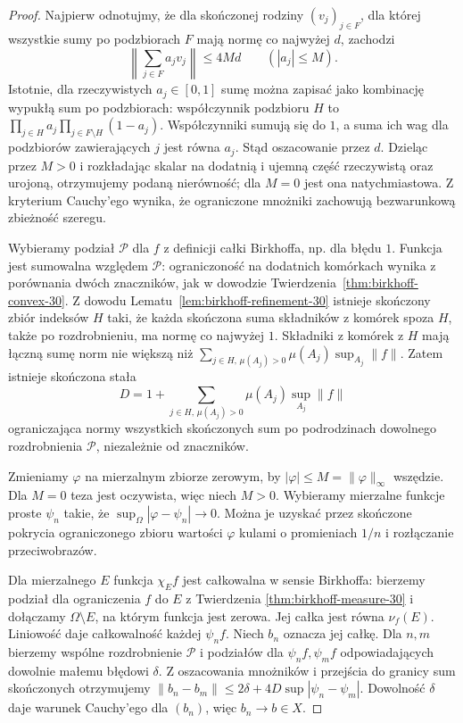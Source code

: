 \begin{proof}
Najpierw odnotujmy, że dla skończonej rodziny
$(v_j)_{j\in F}$, dla której wszystkie sumy po
podzbiorach $F$ mają normę co najwyżej $d$, zachodzi
\[
 \left\|\sum_{j\in F}a_jv_j\right\|\le4Md
 \qquad (|a_j|\le M).
\]
Istotnie, dla rzeczywistych $a_j\in[0,1]$ sumę
można zapisać jako kombinację wypukłą sum po
podzbiorach: współczynnik podzbioru $H$ to
$\prod_{j\in H}a_j\prod_{j\in F\setminus H}(1-a_j)$.
Współczynniki sumują się do $1$, a suma ich wag
dla podzbiorów zawierających $j$ jest równa $a_j$.
Stąd oszacowanie przez $d$. Dzieląc przez $M>0$
i rozkładając skalar na dodatnią i ujemną część
rzeczywistą oraz urojoną, otrzymujemy podaną
nierówność; dla $M=0$ jest ona natychmiastowa.
Z kryterium Cauchy'ego wynika, że ograniczone
mnożniki zachowują bezwarunkową zbieżność szeregu.

Wybieramy podział $\mathcal P$ dla $f$ z definicji
całki Birkhoffa, np. dla błędu $1$.
Funkcja jest sumowalna względem $\mathcal P$:
ograniczoność na dodatnich komórkach wynika
z porównania dwóch znaczników, jak w dowodzie
Twierdzenia~\ref{thm:birkhoff-convex-30}.
Z dowodu Lematu~\ref{lem:birkhoff-refinement-30}
istnieje skończony zbiór indeksów $H$ taki,
że każda skończona suma składników z komórek
spoza $H$, także po rozdrobnieniu, ma normę
co najwyżej $1$. Składniki z komórek z $H$
mają łączną sumę norm nie większą niż
$\sum_{j\in H,\,\mu(A_j)>0}\mu(A_j)\sup_{A_j}\|f\|$.
Zatem istnieje skończona stała
\[
 D=1+\sum_{j\in H,\,\mu(A_j)>0}
       \mu(A_j)\sup_{A_j}\|f\|
\]
ograniczająca normy wszystkich skończonych sum
po podrodzinach dowolnego rozdrobnienia $\mathcal P$,
niezależnie od znaczników.

Zmieniamy $\varphi$ na mierzalnym zbiorze zerowym,
by $|\varphi|\le M=\|\varphi\|_\infty$ wszędzie.
Dla $M=0$ teza jest oczywista, więc niech $M>0$.
Wybieramy mierzalne funkcje proste $\psi_n$ takie,
że $\sup_\Omega|\varphi-\psi_n|\to0$.
Można je uzyskać przez skończone pokrycia
ograniczonego zbioru wartości $\varphi$ kulami
o promieniach $1/n$ i rozłączanie przeciwobrazów.

Dla mierzalnego $E$ funkcja $\chi_E f$ jest
całkowalna w sensie Birkhoffa: bierzemy podział
dla ograniczenia $f$ do $E$ z Twierdzenia
\ref{thm:birkhoff-measure-30} i dołączamy
$\Omega\setminus E$, na którym funkcja jest zerowa.
Jej całka jest równa $\nu_f(E)$.
Liniowość daje całkowalność każdej $\psi_n f$.
Niech $b_n$ oznacza jej całkę.
Dla $n,m$ bierzemy wspólne rozdrobnienie
$\mathcal P$ i podziałów dla $\psi_n f,\psi_m f$
odpowiadających dowolnie małemu błędowi $\delta$.
Z oszacowania mnożników i przejścia do granicy
sum skończonych otrzymujemy
$\|b_n-b_m\|\le2\delta+4D\sup|\psi_n-\psi_m|$.
Dowolność $\delta$ daje warunek Cauchy'ego
dla $(b_n)$, więc $b_n\to b\in X$.


\end{proof}
